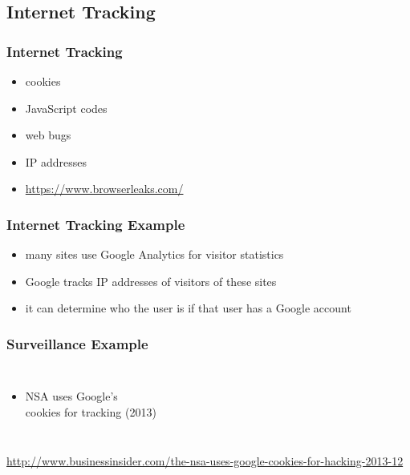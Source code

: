 \documentclass[dvipsnames]{beamer}
\theoremstyle{plain}
\begin{document}
\subsection{Internet Tracking}

\begin{frame}
  \frametitle{Internet Tracking}

  \begin{itemize}
    \item cookies
    \item JavaScript codes
    \item web bugs
    \item IP addresses

    \medskip
    \item \url{https://www.browserleaks.com/}
  \end{itemize}
\end{frame}

\begin{frame}
  \frametitle{Internet Tracking Example}

  \begin{itemize}
    \item many sites use Google Analytics for visitor statistics
    \item Google tracks IP addresses of visitors of these sites
    \item it can determine who the user is if that user has a Google account
  \end{itemize}
\end{frame}

\begin{frame}
  \frametitle{Surveillance Example}

  \begin{columns}

    \begin{itemize}
      \item NSA uses Google's\\
        cookies for tracking (2013)
    \end{itemize}
  \end{columns}

  \medskip
  \tiny{\url{http://www.businessinsider.com/the-nsa-uses-google-cookies-for-hacking-2013-12}}\\
\end{frame}
\end{document}
